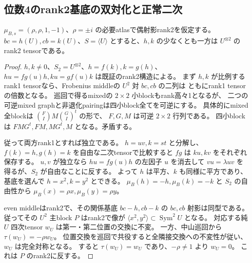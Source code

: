 \subsection{位数4のrank2基底の双対化と正常二次}
\label{subsec:cubic-fourth-root-unit-simple-rank2}
\begin{lemma}
\label{lem:cubic-fourth-root-rank2-nondegenerate-normal}
$\mu_{B,s}=(\rho,\rho,1,-1)$、$\rho=\pm i$ の必要atlasで偶射影rank2を仮定する。
$bc=h(U),cb=k(U)$、$S=\langle U\rangle$ とすると、$h,k$ の少なくとも一方は
$U^{\otimes2}$ のrank2 tensorである。
\end{lemma}
\begin{proof}
$h,k\ne0$、$S_2=U^{\otimes2}$、$h=f(k),k=g(h)$、
$h u=fg(u)h,k u=gf(u)k$ は既証のrank2構造による。
まず $h,k$ が比例するrank1 tensorなら、Frobenius middleの $U^2$ 対 $bc,cb$ の二列は
ともにrank1 tensorの倍数となる。
巡回で得るmixedの $2\times2$ 小blockもrank高々1となるが、
二つの可逆mixed graphと非退化pairingは四小block全てを可逆にする。
具体的にmixed全blockは $\binom{F}{I}M\binom{G}{I}^{t}$ の形で、
$F,G,M$ は可逆 $2\times2$ 行列である。
四小blockは $FMG^t,FM,MG^t,M$ となる。矛盾する。

従って両方rank1とすれば独立である。
$h=u v,k=s t$ と分解し、$f(k)=h,g(h)=k$ を自由な二次tensorで比較すると
$fg$ は $ku,kv$ をそれぞれ保存する。
$u,v$ が独立なら $h u=fg(u)h$ の左因子 $u$ を消去して
$vu=\lambda uv$ を得るが、$S_2$ が自由なことに反する。
よって $h$ は平方、$k$ も同様に平方であり、基底を選んで $h=x^2,k=y^2$ とできる。
$\mu_B(h)=-h,\mu_B(k)=-k$ と $S_2$ の自由性から
$\mu_B(x)=\rho x,\mu_B(y)=\rho y$。

even middleはrank2で、その関係基底 $bc-h,cb-k$ の $bc,cb$ 射影は同型である。
従ってその $U^2$ 主block $P$ はrank2で像が $\langle x^2,y^2\rangle\subset\operatorname{Sym}^2U$ となる。
対応する純 $U$ 四次tensor $w_U$ は第一・第二位置の交換に不変。
一方、中山巡回から $\tau(w_U)=-\rho w_U$。
位置交換を巡回で共役すると全隣接交換への不変性が従い、$w_U$ は完全対称となる。
すると $\tau(w_U)=w_U$ であり、$-\rho\ne1$ より $w_U=0$。
これは $P$ のrank2に反する。
\end{proof}

